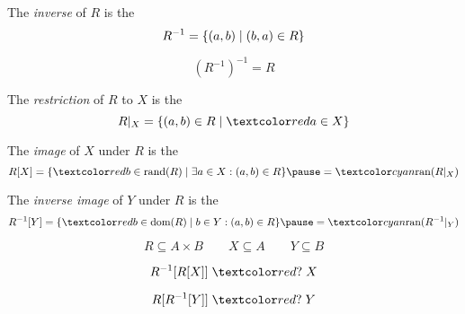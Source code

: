 
\begin{frame}{}
  \begin{center}
  \end{center}
\end{frame}

\begin{frame}{}
  \begin{definition}[Inverse]
    The {\it inverse} of $R$ is the 
    \[
      R^{-1} = \{(a, b) \mid (b, a) \in R\}
    \]
  \end{definition}

  \pause
  \vspace{0.50cm}
  \begin{theorem}
    \[
      (R^{-1})^{-1} = R
    \]
  \end{theorem}
  
  \pause
  \vspace{0.50cm}
  \begin{definition}[Restriction]
    The {\it restriction} of $R$ to $X$ is the 
    \[
      R|_{X} = \set{(a, b) \in R \mid \red{a \in X}}
    \]
  \end{definition}
\end{frame}

\begin{frame}{}
  \begin{definition}[Image]
    The {\it image} of $X$ under $R$ is the 
    \[
      {R[X] = \set{\red{b \in \text{rand}(R)} \mid \exists a \in X: (a, b) \in R} \pause = \cyan{\text{ran}(R|_{X})}}
    \]
  \end{definition}

  \pause
  \vspace{0.50cm}
  \begin{definition}
    The {\it inverse image} of $Y$ under $R$ is the 
    \[
      {R^{-1}[Y] = \set{\red{b \in \text{dom}(R)} \mid b \in Y: (a, b) \in R} \pause = \cyan{\text{ran}(R^{-1}|_{Y})}}
    \]
  \end{definition}
\end{frame}

\begin{frame}{}
  \[
    R \subseteq A \times B \qquad X \subseteq A \qquad Y \subseteq B
  \]

  \pause
  \[
    R^{-1}[R[X]] \;\red{?}\; X
  \]

  \[
    R[R^{-1}[Y]] \;\red{?}\; Y
  \]

  \pause
  \vspace{0.60cm}
\end{frame}

